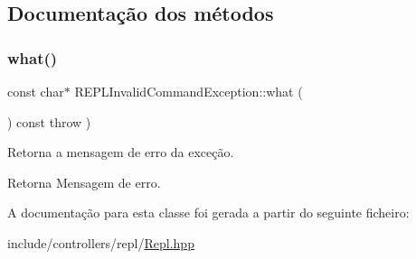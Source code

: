 \subsection{Documentação dos métodos}
\mbox{\label{classREPLInvalidCommandException_aec4c314ef19ce522dedb49c7451bafc0}} 
\subsubsection{\texorpdfstring{what()}{what()}}
{\footnotesize\ttfamily const char$\ast$ R\+E\+P\+L\+Invalid\+Command\+Exception\+::what (\begin{DoxyParamCaption}{ }\end{DoxyParamCaption}) const throw  ) \hspace{0.3cm}{\ttfamily [inline]}}

Retorna a mensagem de erro da exceção. \begin{DoxyReturn}{Retorna}
Mensagem de erro. 
\end{DoxyReturn}


A documentação para esta classe foi gerada a partir do seguinte ficheiro\+:\begin{DoxyCompactItemize}
\item 
include/controllers/repl/\hyperlink{Repl_8hpp}{Repl.\+hpp}\end{DoxyCompactItemize}
